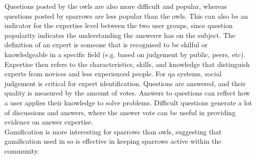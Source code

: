 Questions posted by the owls are also more difficult and popular, whereas questions posted by sparrows are less popular than the owls. 
This can also be an indicator for the expertise level between the two user groups, since question popularity indicates the understanding the answerer has on the subject.
The definition of an expert is someone that is recognised to be skilful or knowledgeable in a specific field (e.g. based on judgement by public, peers, etc). 
Expertise then refers to the characteristics, skills, and knowledge that distinguish experts from novices and less experienced people.
For \gls{qa} systems, social judgement is critical for expert identification. Questions are answered, and their quality is measured by the amount of votes.
Answers to questions can reflect how a user applies their knowledge to solve problems. 
Difficult questions generate a lot of discussions and answers, where the answer vote can be useful in providing evidence on answer expertise. \\
Gamification is more interesting for sparrows than owls, suggesting that gamification used in \gls{so} is effective in keeping sparrows active within the community.
\cite{Yang2014}


